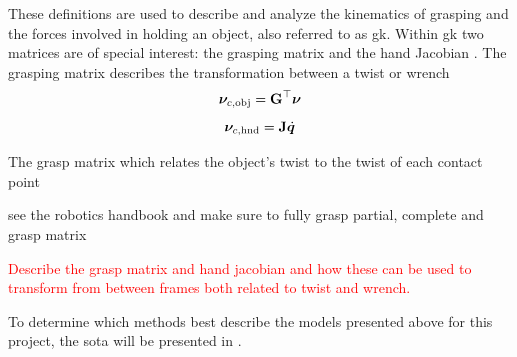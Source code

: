 These definitions are used to describe and analyze the kinematics of grasping and the forces involved in holding an object, also referred to as \gls{gk}. Within \gls{gk} two matrices are of special interest: the grasping matrix  and the hand Jacobian . The grasping matrix describes the transformation between a twist or wrench 
%
\begin{equation}
	\bm{\nu}_{c,\text{obj}} =  \bm{\mathrm{G}}^\top \bm{\nu}
	\label{eq:grasp-matrix}
\end{equation}
% 
\begin{equation}
	\bm{\nu}_{c,\text{hnd}} = \bm{\mathrm{J}} \dot{\bm{q}}
	\label{eq:hand-jacobian}
\end{equation}

The grasp matrix which relates the object's twist \vec{\nu} to the twist of each contact point

see the robotics handbook and make sure to fully grasp partial, complete and grasp matrix

\textcolor{red}{Describe the grasp matrix and hand jacobian and how these can be used to transform from between frames both related to twist and wrench.}

To determine which methods best describe the models presented above for this project, the \gls{sota} will be presented in .


